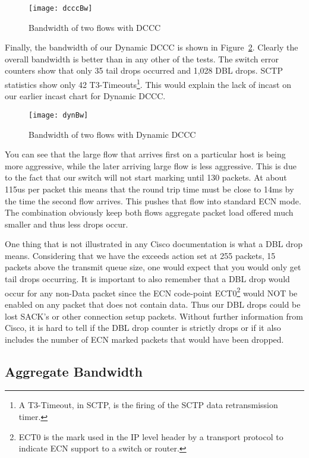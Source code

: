 \documentclass[12pt]{article}
\begin{document}
\begin{figure}[!h]
\centering
\texttt{[image: dcccBw]}
\caption{Bandwidth of two flows with DCCC}
\label{fig:dcccBw}
\end{figure}



Finally, the bandwidth of our Dynamic DCCC is shown in Figure~\ref{fig:dynBw}. Clearly the
overall bandwidth is better than in any other of the tests. The switch error counters show that only 35 tail
drops occurred and 1,028 DBL drops. SCTP statistics show only 42 T3-Timeouts\footnote{A T3-Timeout, in SCTP, is the firing of the SCTP data retransmission timer.}. 
This would explain the lack of incast on our earlier incast chart for Dynamic DCCC.

\begin{figure}[!h]
\centering
\texttt{[image: dynBw]}
\caption{Bandwidth of two flows with Dynamic DCCC}
\label{fig:dynBw}
\end{figure}


You can see that the large flow that arrives first on a particular
host is being more aggressive, while the later arriving large flow is less aggressive. This is due to
the fact that our switch will not start marking until 130 packets. At about 115us per packet this means
that the round trip time must be close to 14ms by the time the second flow arrives. This pushes that
flow into standard ECN mode. The combination obviously keep both flows aggregate packet load
offered much smaller and thus less drops occur.

One thing that is not illustrated in any Cisco documentation is what a DBL drop means. Considering
that we have the exceeds action set at 255 packets, 15 packets above the transmit queue size, one
would expect that you would only get tail drops occurring.  It is important to also remember that a DBL 
drop would occur for any non-Data packet since the ECN code-point ECT0\footnote{ECT0 is the
mark used in the IP level header by a transport protocol to indicate ECN support to a switch
or router.} would NOT be enabled on any packet that
does not contain data. Thus our DBL drops could be lost SACK's or other connection setup packets.
Without further information from Cisco, it is hard to tell if the DBL drop counter is strictly drops or
if it also includes the number of ECN marked packets that would have been dropped.

\subsection{Aggregate Bandwidth}
\end{document}
